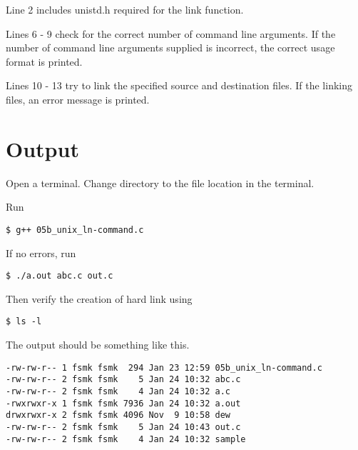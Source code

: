

Line 2 includes unistd.h required for the link function.

Lines 6 - 9 check for the correct number of command line arguments. If the number of command line arguments supplied is incorrect, the correct usage format is printed.

Lines 10 - 13 try to link the specified source and destination files. If the linking files, an error message is printed.

\section{Output}

Open a terminal. Change directory to the file location in the terminal.

Run
\begin{lstlisting}[style=shell-command]
$ g++ 05b_unix_ln-command.c
\end{lstlisting}

If no errors, run
\begin{lstlisting}[style=shell-command]
$ ./a.out abc.c out.c
\end{lstlisting}

Then verify the creation of hard link using
\begin{lstlisting}[style=shell-command]
$ ls -l
\end{lstlisting}


The output should be something like this.
\begin{lstlisting}[style=shell-output]
-rw-rw-r-- 1 fsmk fsmk  294 Jan 23 12:59 05b_unix_ln-command.c
-rw-rw-r-- 2 fsmk fsmk    5 Jan 24 10:32 abc.c
-rw-rw-r-- 2 fsmk fsmk    4 Jan 24 10:32 a.c
-rwxrwxr-x 1 fsmk fsmk 7936 Jan 24 10:32 a.out
drwxrwxr-x 2 fsmk fsmk 4096 Nov  9 10:58 dew
-rw-rw-r-- 2 fsmk fsmk    5 Jan 24 10:43 out.c
-rw-rw-r-- 2 fsmk fsmk    4 Jan 24 10:32 sample
\end{lstlisting}
